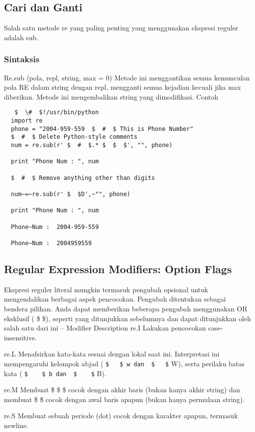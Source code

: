 \begin{enumerate}
\begin{enumerate}
\subsection{Cari dan Ganti}
Salah satu metode re yang paling penting yang menggunakan ekspresi reguler adalah sub.
  \subsubsection{Sintaksis}
  Re.sub (pola, repl, string, max = 0)
  Metode ini menggantikan semua kemunculan pola RE dalam string dengan repl, mengganti semua kejadian kecuali jika max diberikan. Metode ini mengembalikan string yang dimodifikasi.
  Contoh
  \begin{verbatim}
   $  \#  $!/usr/bin/python
  import re
  phone = "2004-959-559  $  #  $ This is Phone Number"
  $  #  $ Delete Python-style comments
  num = re.sub(r' $  #  $.* $  $  $', "", phone)

  print "Phone Num : ", num

  $  #  $ Remove anything other than digits

  num~=~re.sub(r' $  $D',~"", phone)

  print "Phone Num : ", num

  Phone~Num :  2004-959-559

  Phone~Num :  2004959559
  \end{verbatim}

\subsection{Regular Expression Modifiers: Option Flags}
Ekspresi reguler literal mungkin termasuk pengubah opsional untuk mengendalikan berbagai aspek pencocokan. Pengubah ditentukan sebagai bendera pilihan. Anda dapat memberikan beberapa pengubah menggunakan OR eksklusif ( \$   \$), seperti yang ditunjukkan sebelumnya dan dapat ditunjukkan oleh salah satu dari ini – Modifier Description
re.I
Lakukan pencocokan case-insensitive.

re.L
Menafsirkan kata-kata sesuai dengan lokal saat ini. Interpretasi ini mempengaruhi kelompok abjad ( \verb|$   $ w dan  $   $| W), serta perilaku batas kata ( \verb|$    $ b dan  $    $| B).

re.M
Membuat  \$  \$  \$ cocok dengan akhir baris (bukan hanya akhir string) dan membuat  \$   \$ cocok dengan awal baris apapun (bukan hanya permulaan string).

re.S
Membuat sebuah periode (dot) cocok dengan karakter apapun, termasuk newline.


\end{enumerate}
\end{enumerate}

